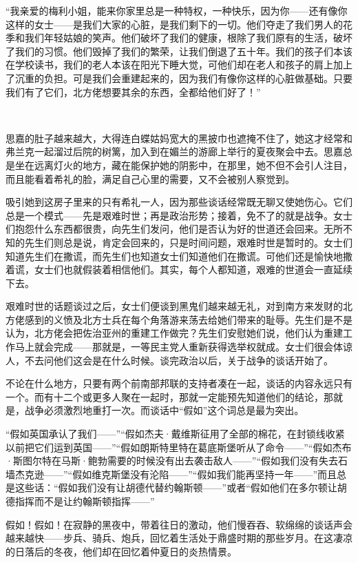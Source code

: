 \par “我亲爱的梅利小姐，能来你家里总是一种特权，一种快乐，因为你——还有像你这样的女士——是我们大家的心脏，是我们剩下的一切。他们夺走了我们男人的花季和我们年轻姑娘的笑声。他们破坏了我们的健康，根除了我们原有的生活，破坏了我们的习惯。他们毁掉了我们的繁荣，让我们倒退了五十年。我们的孩子们本该在学校读书，我们的老人本该在阳光下睡大觉，可他们却在老人和孩子的肩上加上了沉重的负担。可是我们会重建起来的，因为我们有像你这样的心脏做基础。只要我们有了它们，北方佬想要其余的东西，全都给他们好了！”
\par  
\par 思嘉的肚子越来越大，大得连白蝶姑妈宽大的黑披巾也遮掩不住了，她这才经常和弗兰克一起溜过后院的树篱，加入到在媚兰的游廊上举行的夏夜聚会中去。思嘉总是坐在远离灯火的地方，藏在能保护她的阴影中，在那里，她不但不会引人注目，而且能看着希礼的脸，满足自己心里的需要，又不会被别人察觉到。
\par 吸引她到这房子里来的只有希礼一人，因为那些谈话经常既无聊又使她伤心。它们总是一个模式——先是艰难时世；再是政治形势；接着，免不了的就是战争。女士们抱怨什么东西都很贵，向先生们发问，他们是否认为好的世道还会回来。无所不知的先生们则总是说，肯定会回来的，只是时间问题，艰难时世是暂时的。女士们知道先生们在撒谎，而先生们也知道女士们知道他们在撒谎。可他们还是愉快地撒着谎，女士们也就假装着相信他们。其实，每个人都知道，艰难的世道会一直延续下去。
\par 艰难时世的话题谈过之后，女士们便谈到黑鬼们越来越无礼，对到南方来发财的北方佬感到的义愤及北方士兵在每个角落游来荡去给她们带来的耻辱。先生们是不是认为，北方佬会把佐治亚州的重建工作做完？先生们安慰她们说，他们认为重建工作马上就会完成——那就是，一等民主党人重新获得选举权就成。女士们很会体谅人，不去问他们这会是在什么时候。谈完政治以后，关于战争的谈话开始了。
\par 不论在什么地方，只要有两个前南部邦联的支持者凑在一起，谈话的内容永远只有一个。而有十二个或更多人聚在一起时，那就一定能预先知道他们的结论，那就是，战争必须激烈地重打一次。而谈话中“假如”这个词总是最为突出。
\par “假如英国承认了我们——”“假如杰夫·戴维斯征用了全部的棉花，在封锁线收紧以前把它们运到英国——”“假如朗斯特里特在葛底斯堡听从了命令——”“假如杰布·斯图尔特在马斯·鲍勃需要的时候没有出去袭击敌人——”“假如我们没有失去石墙杰克逊——”“假如维克斯堡没有沦陷——”“假如我们能再坚持一年——”而且总是这些话：“假如我们没有让胡德代替约翰斯顿——”或者“假如他们在多尔顿让胡德指挥而不是让约翰斯顿指挥——”
\par 假如！假如！在寂静的黑夜中，带着往日的激动，他们慢吞吞、软绵绵的谈话声会越来越快——步兵、骑兵、炮兵，回忆着生活处于鼎盛时期的那些岁月。在这凄凉的日落后的冬夜，他们却在回忆着仲夏日的炎热情景。
